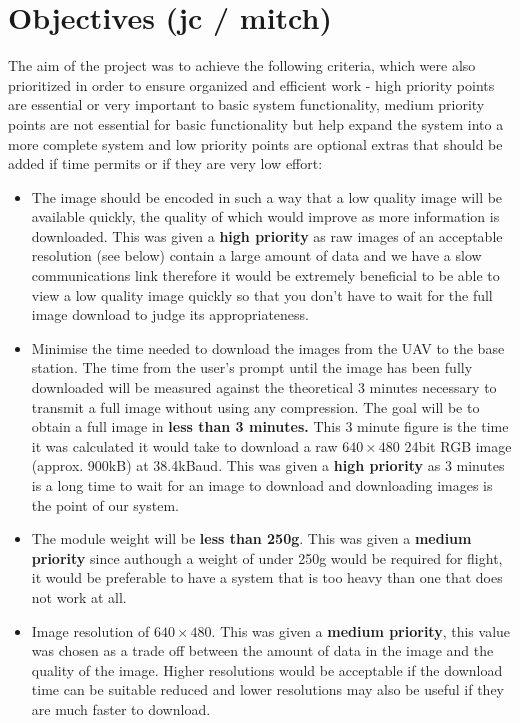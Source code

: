\section{Objectives (jc / mitch)} 

The aim of the project was to achieve the following criteria, which were also prioritized in order to ensure organized and efficient work - high priority points are essential or very important to basic system functionality, medium priority points are not essential for basic functionality but help expand the system into a more complete system and low priority points are optional extras that should be added if time permits or if they are very low effort:

\begin{itemize}
	\item The image should be encoded in such a way that a low quality image will be available quickly, the quality of which would improve as more information is downloaded. This was given a \textbf{high priority} as raw images of an acceptable resolution (see below) contain a large amount of data and we have a slow communications link therefore it would be extremely beneficial to be able to view a low quality image quickly so that you don't have to wait for the full image download to judge its appropriateness.
	\item Minimise the time needed to download the images from the UAV to the base station. The time from the user’s prompt until the image has been fully downloaded will be measured against the theoretical 3 minutes necessary to transmit a full image without using any compression. The goal will be to obtain a full image in \textbf{less than 3 minutes.} This 3 minute figure is the time it was calculated it would take to download a raw $640\times480$ 24bit RGB image (approx. 900kB) at 38.4kBaud. This was given a \textbf{high priority} as 3 minutes is a long time to wait for an image to download and downloading images is the point of our system.
	\item The module weight will be \textbf{less than 250g}. This was given a \textbf{medium priority} since authough a weight of under 250g would be required for flight, it would be preferable to have a system that is too heavy than one that does not work at all.%
	\item Image resolution of \textbf{$640\times480$}. This was given a \textbf{medium priority}, this value was chosen as a trade off between the amount of data in the image and the quality of the image. Higher resolutions would be acceptable if the download time can be suitable reduced and lower resolutions may also be useful if they are much faster to download.

\end{itemize}
